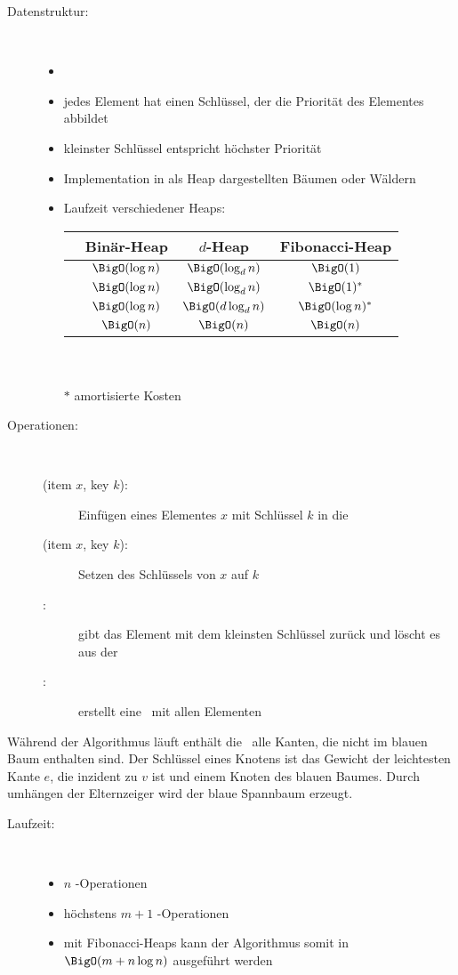 \begin{description}
	\item[Datenstruktur:]\ \\\up
		\begin{itemize}
			\item \PQ
			\item jedes Element hat einen Schlüssel, der die Priorität des Elementes abbildet
			\item kleinster Schlüssel entspricht höchster Priorität
			\item Implementation in als Heap dargestellten Bäumen oder Wäldern
			\item Laufzeit verschiedener Heaps:\\
				\begin{tabular}{c||c|c|c}
				& Binär-Heap & $d$-Heap & Fibonacci-Heap\\\hline
				\insert & $\BigO(\log n)$ & $\BigO(\log_d n)$ & $\BigO(1)$\\\hline
				\decKey & $\BigO(\log n)$&$\BigO(\log_d n)$&$\BigO(1)^{*}$\\\hline
				\exMin&$\BigO(\log n)$&$\BigO(d \log_d n)$&$\BigO(\log n)^{*}$\\\hline
				\make &$\BigO(n)$&$\BigO(n)$&$\BigO(n)$
				\end{tabular}\\\\
			$*$ amortisierte Kosten
		\end{itemize}
	\item[Operationen:]\ \\\up
		\begin{description}
			\item[\insert(item $x$, key $k$):] Einfügen eines Elementes $x$ mit Schlüssel $k$ in die \PQ
			\item[\decKey(item $x$, key $k$):] Setzen des Schlüssels von $x$ auf $k$
			\item[\exMin:] gibt das Element mit dem kleinsten Schlüssel zurück und löscht es aus der \PQ
			\item[\make:] erstellt eine \PQ~mit allen Elementen
		\end{description}
\end{description}
Während der Algorithmus läuft enthält die \PQ~alle Kanten, die nicht im blauen Baum enthalten sind. Der Schlüssel eines Knotens ist das Gewicht der leichtesten Kante $e$, die inzident zu $v$ ist und einem Knoten des blauen Baumes. Durch umhängen der Elternzeiger wird der blaue Spannbaum erzeugt.
\begin{description}
	\item[Laufzeit:] \ \\\up
		\begin{itemize}
			\item $n$ \exMin-Operationen
			\item höchstens $m+1$ \decKey-Operationen
			\item mit Fibonacci-Heaps kann der Algorithmus somit in $\BigO(m+n\log n)$ ausgeführt werden
		\end{itemize}
\end{description}
